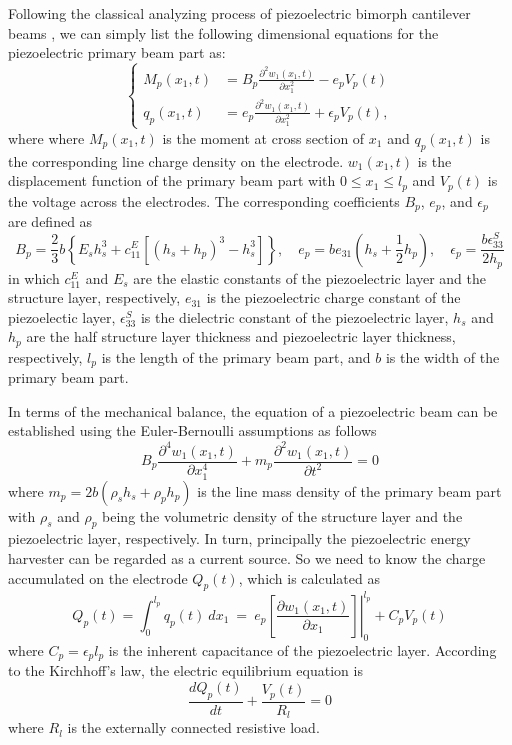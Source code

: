 \documentclass{elsarticle}
\begin{document}
Following the classical analyzing process of piezoelectric bimorph cantilever beams \cite{erturk2009experimentally,park2003dynamics}, we can simply list the following dimensional equations for the piezoelectric primary beam part as:
\begin{equation}
    \left\{\begin{aligned}
        M_p(x_1,t) &= B_p \frac{\partial^2 w_1(x_1,t)}{\partial x_1^2} - e_p V_p (t) \\
        q_p(x_1,t) &= e_p \frac{\partial^2 w_1(x_1,t)}{\partial x_1^2} + \epsilon_p V_p (t),
    \end{aligned}\right.
\end{equation}
where where $M_p(x_1,t)$ is the moment at cross section of $x_1$ and $q_p(x_1,t)$ is the corresponding line charge density on the electrode. $w_1(x_1,t)$ is the displacement function of the primary beam part with $0 \leq x_1 \leq l_p$ and $V_p(t)$ is the voltage across the electrodes. The corresponding coefficients $B_p$, $e_p$, and $\epsilon_p$ are defined as
\begin{equation}
    B_p = \frac{2}{3}b\left\{ E_s h_s^3 + c_{11}^E \left[ (h_s+h_p)^3 - h_s^3 \right] \right\}, \quad e_p = b e_{31}\left(h_s+\frac{1}{2}h_p\right), \quad \epsilon_p = \frac{b \epsilon_{33}^S}{2 h_p}
\end{equation}
in which $c_{11}^E$ and $E_s$ are the elastic constants of the piezoelectric layer and the structure layer, respectively, $e_{31}$ is the piezoelectric charge constant of the piezoelectic layer, $\epsilon_{33}^S$ is the dielectric constant of the piezoelectric layer, $h_s$ and $h_p$ are the half structure layer thickness and piezoelectric layer thickness, respectively, $l_p$ is the length of the primary beam part, and $b$ is the width of the primary beam part.

In terms of the mechanical balance, the equation of a piezoelectric beam can be established using the Euler-Bernoulli assumptions as follows
\begin{equation}
    B_p \frac{\partial^4 w_1(x_1,t)}{\partial x_1^4} + m_p \frac{\partial^2 w_1(x_1,t)}{\partial t^2} = 0
\end{equation}
where $m_p = 2 b(\rho_s h_s + \rho_p h_p)$ is the line mass density of the primary beam part with $\rho_s$ and $\rho_p$ being the volumetric density of the structure layer and the piezoelectric layer, respectively. In turn, principally the piezoelectric energy harvester can be regarded as a current source. So we need to know the charge accumulated on the electrode $Q_p(t)$, which is calculated as 
\begin{equation}
    Q_p(t) = \int_0^{l_p} q_p(t)\ d x_1\ = \ e_p \left.\left[ \frac{\partial w_1(x_1,t)}{\partial x_1} \right]\right|^{l_p}_0 + C_p V_p (t)
\end{equation}
where $C_p = \epsilon_p l_p$ is the inherent capacitance of the piezoelectric layer. According to the Kirchhoff's law, the electric equilibrium equation is 
\begin{equation}
    \frac{d Q_p(t)}{dt}  + \frac{V_p(t)}{R_l} = 0
\end{equation}
where $R_l$ is the externally connected resistive load.
\end{document}
